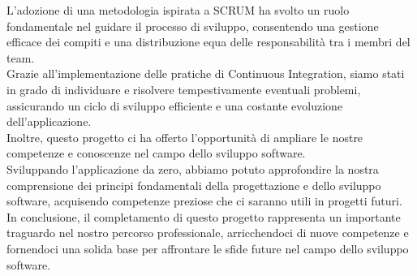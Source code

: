 L'adozione di una metodologia ispirata a SCRUM ha svolto un ruolo fondamentale nel guidare il processo di sviluppo,
consentendo una gestione efficace dei compiti e una distribuzione equa delle responsabilità tra i membri del team.\\Grazie
all'implementazione delle pratiche di Continuous Integration, siamo stati in grado di individuare e risolvere tempestivamente
eventuali problemi, assicurando un ciclo di sviluppo efficiente e una costante evoluzione dell'applicazione.\\
Inoltre, questo progetto ci ha offerto l'opportunità di ampliare le nostre competenze e conoscenze nel campo dello sviluppo software.\\
Sviluppando l'applicazione da zero, abbiamo potuto approfondire la nostra comprensione dei principi fondamentali della progettazione
e dello sviluppo software, acquisendo competenze preziose che ci saranno utili in progetti futuri.\\
In conclusione, il completamento di questo progetto rappresenta un importante traguardo nel nostro percorso professionale,
arricchendoci di nuove competenze e fornendoci una solida base per affrontare le sfide future nel campo dello sviluppo software.